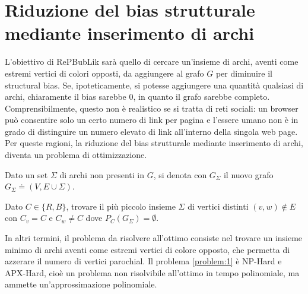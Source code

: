 \section{Riduzione del bias strutturale mediante inserimento di archi}
L'obiettivo di RePBubLik sarà quello di cercare un'insieme di archi, aventi come estremi vertici
di colori opposti, da aggiungere al grafo $G$ per diminuire il structural bias. Se, ipoteticamente,
si potesse aggiungere una quantità qualsiasi di archi, chiaramente il bias sarebbe 0, in quanto il 
grafo sarebbe completo. Comprensibilmente, questo non è realistico se si tratta di reti sociali: un browser 
può consentire solo un certo numero di link per pagina e l'essere umano non è in grado di distinguire 
un numero elevato di link all'interno della singola web page.\\
Per queste ragioni, la riduzione del bias strutturale mediante inserimento di archi, diventa un problema
di ottimizzazione.
\begin{definition}
    Dato un set $\Sigma$ di archi non presenti in $G$, si denota con $G_{\Sigma}$ il nuovo grafo $G_{\Sigma}\doteq (V,E \cup \Sigma)$. 
\end{definition}
\begin{problem}\label{problem:1}
    Dato $C \in \{R,B\}$, trovare il più piccolo insieme $\Sigma$ di vertici distinti $(v,w)\not \in E$ con $C_v=C$ e $C_w\not = C$ dove $P_C(G_\Sigma)= \emptyset $.
\end{problem}
In altri termini, il problema da risolvere all'ottimo consiste nel trovare un insieme minimo di archi aventi come estremi vertici di colore opposto, che permetta 
di azzerare il numero di vertici parochial. Il problema \ref{problem:1} è NP-Hard e APX-Hard, cioè un problema non risolvibile all'ottimo in tempo polinomiale,
ma ammette un'approssimazione polinomiale.
